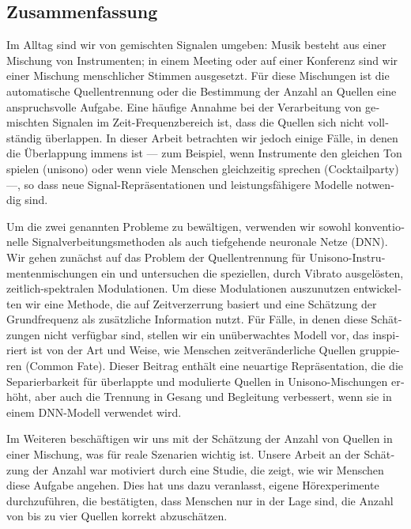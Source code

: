 \begin{otherlanguage}{ngerman}
\chapter*{Zusammenfassung}

Im Alltag sind wir von gemischten Signalen umgeben: Musik besteht aus einer Mischung von Instrumenten; in einem Meeting oder auf einer Konferenz sind wir einer Mischung menschlicher Stimmen ausgesetzt.
Für diese Mischungen ist die automatische Quellentrennung oder die Bestimmung der Anzahl an Quellen eine anspruchsvolle Aufgabe.
Eine häufige Annahme bei der Verarbeitung von gemischten Signalen im Zeit-Frequenzbereich ist, dass die Quellen sich nicht vollständig überlappen.
In dieser Arbeit betrachten wir jedoch einige Fälle, in denen die Überlappung immens ist --- zum Beispiel, wenn Instrumente den gleichen Ton spielen (unisono) oder wenn viele Menschen gleichzeitig sprechen (Cocktailparty) ---, so dass neue Signal-Repräsentationen und leistungsfähigere Modelle notwendig sind.
\par
Um die zwei genannten Probleme zu bewältigen, verwenden wir sowohl konventionelle Signalverbeitungsmethoden als auch tiefgehende neuronale Netze (DNN).
Wir gehen zunächst auf das Problem der Quellentrennung für Unisono-Instrumentenmischungen ein und untersuchen die speziellen, durch Vibrato ausgelösten, zeitlich-spektralen Modulationen.
Um diese Modulationen auszunutzen entwickelten wir eine Methode, die auf Zeitverzerrung basiert und eine Schätzung der Grundfrequenz als zusätzliche Information nutzt.
Für Fälle, in denen diese Schätzungen nicht verfügbar sind, stellen wir ein unüberwachtes Modell vor, das inspiriert ist von der Art und Weise, wie Menschen zeitveränderliche Quellen gruppieren (Common Fate).
Dieser Beitrag enthält eine neuartige Repräsentation, die die Separierbarkeit für überlappte und modulierte Quellen in Unisono-Mischungen erhöht, aber auch die Trennung in Gesang und Begleitung verbessert, wenn sie  in einem DNN-Modell verwendet wird.
\par
Im Weiteren beschäftigen wir uns mit der Schätzung der Anzahl von Quellen in einer Mischung, was für reale Szenarien wichtig ist.
Unsere Arbeit an der Schätzung der Anzahl war motiviert durch eine Studie, die zeigt, wie wir Menschen diese Aufgabe angehen.
Dies hat uns dazu veranlasst, eigene Hörexperimente durchzuführen, die bestätigten, dass Menschen nur in der Lage sind, die Anzahl von bis zu vier Quellen korrekt abzuschätzen.

\end{otherlanguage}

